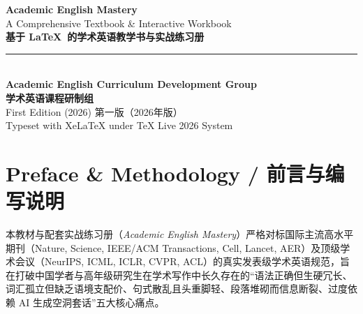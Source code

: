 \thispagestyle{empty}
\begin{center}
  \vspace*{2cm}
  {\fontsize{28}{34}\selectfont\bfseries\color{AcadNavy} Academic English Mastery}\\[1em]
  {\fontsize{16}{22}\selectfont\color{AcadSlate} A Comprehensive Textbook \& Interactive Workbook}\\[0.8em]
  {\fontsize{14}{20}\selectfont\color{AcadNavy}\bfseries 基于 \LaTeX\ 的学术英语教学书与实战练习册}\\[2em]
  {\color{AcadNavy}\rule{0.6\textwidth}{1.5pt}}\\[2.5cm]
  {\large\textbf{Academic English Curriculum Development Group}}\\[0.4em]
  {\normalsize\textbf{学术英语课程研制组}}\\[3cm]
  {\small\color{AcadGray} First Edition (2026) \quad\textbar\quad 第一版（2026年版）}\\[0.3em]
  {\footnotesize\color{AcadGray} Typeset with XeLaTeX under TeX Live 2026 System}
\end{center}
\clearpage

\chapter*{Preface \& Methodology / 前言与编写说明}

本教材与配套实战练习册（\textit{Academic English Mastery}）严格对标国际主流高水平期刊（Nature, Science, IEEE/ACM Transactions, Cell, Lancet, AER）及顶级学术会议（NeurIPS, ICML, ICLR, CVPR, ACL）的真实发表级学术英语规范，旨在打破中国学者与高年级研究生在学术写作中长久存在的“语法正确但生硬冗长、词汇孤立但缺乏语境支配价、句式散乱且头重脚轻、段落堆砌而信息断裂、过度依赖 AI 生成空洞套话”五大核心痛点。

